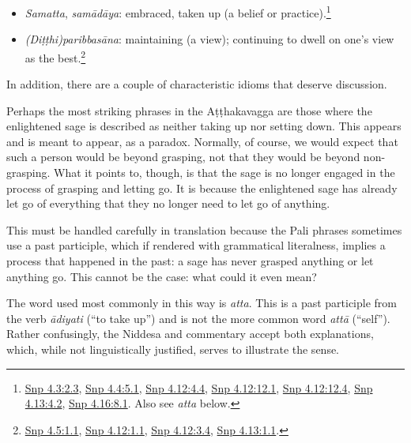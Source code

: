 \documentclass[12pt,openany]{book}%
\begin{document}
\begin{itemize}
\item \textit{Samatta}, \textit{\textsanskrit{samādāya}}: embraced, taken up (a belief or practice).\footnote{\href{https://suttacentral.net/snp4.3/en/sujato\#2.3}{Snp 4.3:2.3}, \href{https://suttacentral.net/snp4.4/en/sujato\#5.1}{Snp 4.4:5.1}, \href{https://suttacentral.net/snp4.12/en/sujato\#4.4}{Snp 4.12:4.4}, \href{https://suttacentral.net/snp4.12/en/sujato\#12.1}{Snp 4.12:12.1}, \href{https://suttacentral.net/snp4.12/en/sujato\#12.4}{Snp 4.12:12.4}, \href{https://suttacentral.net/snp4.13/en/sujato\#4.2}{Snp 4.13:4.2}, \href{https://suttacentral.net/snp4.16/en/sujato\#8.1}{Snp 4.16:8.1}. Also see \textit{atta} below. }%
\item \textit{(\textsanskrit{Diṭṭhi})\textsanskrit{paribbasāna}}: maintaining (a view); continuing to dwell on one’s view as the best.\footnote{\href{https://suttacentral.net/snp4.5/en/sujato\#1.1}{Snp 4.5:1.1}, \href{https://suttacentral.net/snp4.12/en/sujato\#1.1}{Snp 4.12:1.1}, \href{https://suttacentral.net/snp4.12/en/sujato\#3.4}{Snp 4.12:3.4}, \href{https://suttacentral.net/snp4.13/en/sujato\#1.1}{Snp 4.13:1.1}. }%
\end{itemize}

In addition, there are a couple of characteristic idioms that deserve discussion.

Perhaps the most striking phrases in the \textsanskrit{Aṭṭhakavagga} are those where the enlightened sage is described as neither taking up nor setting down. This appears and is meant to appear, as a paradox. Normally, of course, we would expect that such a person would be beyond grasping, not that they would be beyond non-grasping. What it points to, though, is that the sage is no longer engaged in the process of grasping and letting go. It is because the enlightened sage has already let go of everything that they no longer need to let go of anything.

This must be handled carefully in translation because the Pali phrases sometimes use a past participle, which if rendered with grammatical literalness, implies a process that happened in the past: a sage has never grasped anything or let anything go. This cannot be the case: what could it even mean?

The word used most commonly in this way is \textit{atta}. This is a past participle from the verb \textit{\textsanskrit{ādiyati}} (“to take up”) and is not the more common word \textit{\textsanskrit{attā}} (“self”). Rather confusingly, the Niddesa and commentary accept both explanations, which, while not linguistically justified, serves to illustrate the sense.
\end{document}
